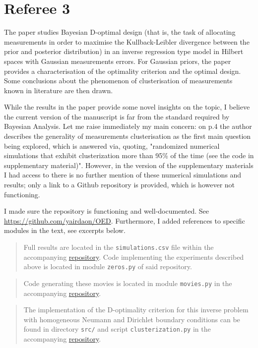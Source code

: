 \section{Referee 3}\label{ref3}
\RC The paper studies Bayesian D-optimal design (that is, the task of
allocating measurements in order to maximise the Kullback-Leibler
divergence between the prior and posterior distribution) in an inverse
regression type model in Hilbert spaces with Gaussian measurements
errors. For Gaussian priors, the paper provides a characterisation of
the optimality criterion and the optimal design. Some conclusions
about the phenomenon of clusterisation of measurements known in
literature are then drawn.


\RC While the results in the paper provide some novel insights on the
topic, I believe the current version of the manuscript is far from the
standard required by Bayesian Analysis. Let me raise immediately my
main concern: on p.4 the author describes the generality of
measurements clusterisation as the first main question being explored,
which is answered via, quoting, "randomized numerical simulations that
exhibit clusterization more than 95\% of the time (see the code in
supplementary material)". However, in the version of the supplementary
materials I had access to there is no further mention of these
numerical simulations and results; only a link to a Github repository
is provided, which is however not functioning.

\AR I made sure the repository is functioning and well-documented. See
\url{https://github.com/yairdaon/OED}. Furthermore, I added references
to specific modules in the text, see excerpts below.

\begin{quote}
Full results are located in the \texttt{simulations.csv} file within
the accompanying \href{https://github.com/yairdaon/OED}{repository}.
Code implementing the experiments described above is located in module
\texttt{zeros.py} of said repository.
\end{quote}
\begin{quote}
Code generating these movies is located in module \texttt{movies.py}
in the accompanying
\href{https://github.com/yairdaon/OED}{repository}.
\end{quote}
\begin{quote}
The implementation of the D-optimality criterion for this inverse
problem with homogeneous Neumann and Dirichlet boundary conditions can
be found in directory \texttt{src/} and script
\texttt{clusterization.py} in the accompanying
\href{https://github.com/yairdaon/OED}{repository}.
\end{quote}


